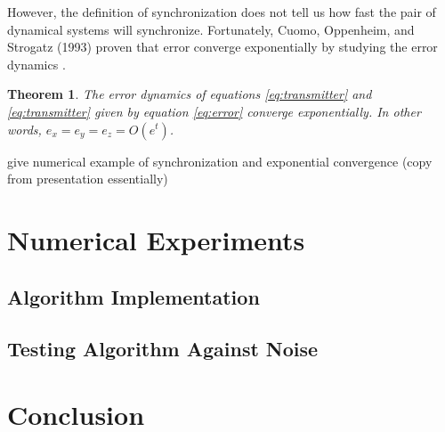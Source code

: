\documentclass[12pt]{article}
\newtheorem{theorem}{Theorem}[section]
\begin{document}
      However, the definition of synchronization does not tell us how fast the pair of dynamical systems will synchronize. Fortunately, Cuomo, Oppenheim, and Strogatz (1993) proven that error converge exponentially by studying the error dynamics \cite{expProof}. 
      \begin{theorem}
        The error dynamics of equations \ref{eq:transmitter} and \ref{eq:transmitter} given by equation \ref{eq:error} converge exponentially. In other words, $e_x = e_y = e_z = O(e^t)$. 
      \end{theorem}
      give numerical example of synchronization and exponential convergence (copy from presentation essentially)
    \section{Numerical Experiments}
    \subsection{Algorithm Implementation}
    \subsection{Testing Algorithm Against Noise}
    \section{Conclusion}
  \newpage    
    \printbibliography
\end{document}
